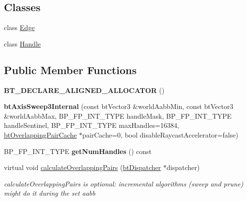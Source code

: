 \subsection*{Classes}
\begin{DoxyCompactItemize}
\item 
class \hyperlink{classbtAxisSweep3Internal_1_1Edge}{Edge}
\item 
class \hyperlink{classbtAxisSweep3Internal_1_1Handle}{Handle}
\end{DoxyCompactItemize}
\subsection*{Public Member Functions}
\begin{DoxyCompactItemize}
\item 
\mbox{\label{classbtAxisSweep3Internal_ad90bd2c40561f5151dee7a938a0afe44}} 
{\bfseries B\+T\+\_\+\+D\+E\+C\+L\+A\+R\+E\+\_\+\+A\+L\+I\+G\+N\+E\+D\+\_\+\+A\+L\+L\+O\+C\+A\+T\+OR} ()
\item 
\mbox{\label{classbtAxisSweep3Internal_ac995b48f3a60ffac694c1d3c1e891226}} 
{\bfseries bt\+Axis\+Sweep3\+Internal} (const bt\+Vector3 \&world\+Aabb\+Min, const bt\+Vector3 \&world\+Aabb\+Max, B\+P\+\_\+\+F\+P\+\_\+\+I\+N\+T\+\_\+\+T\+Y\+PE handle\+Mask, B\+P\+\_\+\+F\+P\+\_\+\+I\+N\+T\+\_\+\+T\+Y\+PE handle\+Sentinel, B\+P\+\_\+\+F\+P\+\_\+\+I\+N\+T\+\_\+\+T\+Y\+PE max\+Handles=16384, \hyperlink{classbtOverlappingPairCache}{bt\+Overlapping\+Pair\+Cache} $\ast$pair\+Cache=0, bool disable\+Raycast\+Accelerator=false)
\item 
\mbox{\label{classbtAxisSweep3Internal_a86d2dfd94fee65d42d8c288de249681b}} 
B\+P\+\_\+\+F\+P\+\_\+\+I\+N\+T\+\_\+\+T\+Y\+PE {\bfseries get\+Num\+Handles} () const
\item 
virtual void \hyperlink{classbtAxisSweep3Internal_ab89835d4ecb51e2dadc7e3b6e7c29adb}{calculate\+Overlapping\+Pairs} (\hyperlink{classbtDispatcher}{bt\+Dispatcher} $\ast$dispatcher)
\begin{DoxyCompactList}\small\item\em calculate\+Overlapping\+Pairs is optional\+: incremental algorithms (sweep and prune) might do it during the set aabb \end{DoxyCompactList}\item 
\mbox{\label{classbtAxisSweep3Internal_ad83a70943bd46e24813b16fbc02b38d6}} 

\end{DoxyCompactItemize}
